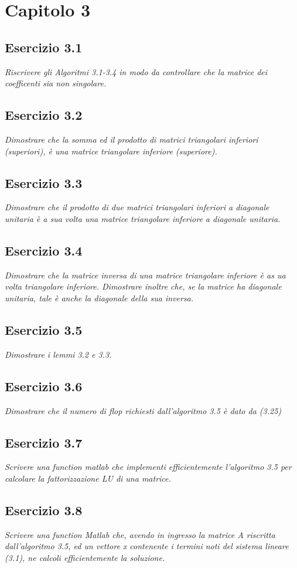 \chapter{Capitolo 3}
\section{Esercizio 3.1}
\emph{Riscrivere gli Algoritmi 3.1-3.4 in modo da controllare che la matrice dei coefficenti sia non singolare.}
\section{Esercizio 3.2}
\emph{Dimostrare che la somma ed il prodotto di matrici triangolari inferiori (superiori), è una matrice triangolare inferiore (superiore).}
\section{Esercizio 3.3}
\emph{Dimostrare che il prodotto di due matrici triangolari inferiori a diagonale unitaria è a sua volta una matrice triangolare inferiore a diagonale unitaria.}
\section{Esercizio 3.4}
\emph{Dimostrare che la matrice inversa di una matrice triangolare inferiore è as ua volta triangolare inferiore. Dimostrare inoltre che, se la matrice ha diagonale unitaria, tale è anche la diagonale della sua inversa.}
\section{Esercizio 3.5}
\emph{Dimostrare i lemmi 3.2 e 3.3.}
\section{Esercizio 3.6}
\emph{Dimostrare che il numero di flop richiesti dall'algoritmo 3.5 è dato da (3.25)}
\section{Esercizio 3.7}
\emph{Scrivere una function matlab che implementi efficientemente l'algoritmo 3.5 per calcolare la fattorizzazione LU di una matrice.}
\section{Esercizio 3.8}
\emph{Scrivere una function Matlab che, avendo in ingresso la matrice A riscritta dall'algoritmo 3.5, ed un vettore x contenente i termini noti del sistema lineare (3.1), ne calcoli efficientemente la soluzione.}

